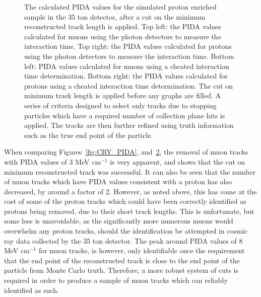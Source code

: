 \begin{figure}
\begin{subfigure}{0.48\textwidth}
        \label{fig:CRY_PIDACuts_Muon_Cheat}
  \end{subfigure}
  \caption[The calculated PIDA values for the simulated proton enriched sample in the 35 ton detector, after a cut on the minimum reconstructed track length is applied]
          {The calculated PIDA values for the simulated proton enriched sample in the 35 ton detector, after a cut on the minimum reconstructed track length is applied. Top left: the PIDA values calculated for muons using the photon detectors to measure the interaction time. Top right: the PIDA values calculated for protons using the photon detectors to measure the interaction time. Bottom left: PIDA values calculated for muons using a cheated interaction time determination. Bottom right: the PIDA values calculated for protons using a cheated interaction time determination. The cut on minimum track length is applied before any graphs are filled. A series of criteria designed to select only tracks due to stopping particles which have a required number of collection plane hits is applied. The tracks are then further refined using truth information such as the true end point of the particle.}
  \label{fig:CRY_PIDACuts}
\end{figure}

When comparing Figures~\ref{fig:CRY_PIDA}, and~\ref{fig:CRY_PIDACuts}, the removal of muon tracks with PIDA values of 3 MeV cm$^{-1}$ is very apparent, and shows that the cut on minimum reconstructed track was successful. It can also be seen that the number of muon tracks which have PIDA values consistent with a proton has also decreased, by around a factor of 2. However, as noted above, this has come at the cost of some of the proton tracks which could have been correctly identified as protons being removed, due to their short track lengths. This is unfortunate, but some loss is unavoidable, as the significantly more numerous muons would overwhelm any proton tracks, should the identification be attempted in cosmic ray data collected by the 35 ton detector. The peak around PIDA values of 8 MeV cm$^{-1}$ for muon tracks, is however, only identifiable once the requirement that the end point of the reconstructed track is close to the end point of the particle from Monte Carlo truth. Therefore, a more robust system of cuts is required in order to produce a sample of muon tracks which can reliably identified as such. \\

